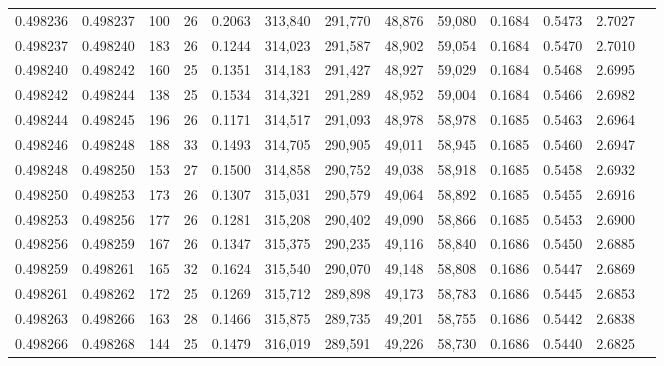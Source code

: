 \begin{tabular}{rrrrrrrrrrrrr}
0.498236 & 0.498237 & 100 &  26 &                                     0.2063 & 313,840 & 291,770 &  48,876 &  59,080 & 0.1684 & 0.5473 & 2.7027 \\
0.498237 & 0.498240 & 183 &  26 &                                     0.1244 & 314,023 & 291,587 &  48,902 &  59,054 & 0.1684 & 0.5470 & 2.7010 \\
0.498240 & 0.498242 & 160 &  25 &                                     0.1351 & 314,183 & 291,427 &  48,927 &  59,029 & 0.1684 & 0.5468 & 2.6995 \\
0.498242 & 0.498244 & 138 &  25 &                                     0.1534 & 314,321 & 291,289 &  48,952 &  59,004 & 0.1684 & 0.5466 & 2.6982 \\
0.498244 & 0.498245 & 196 &  26 &                                     0.1171 & 314,517 & 291,093 &  48,978 &  58,978 & 0.1685 & 0.5463 & 2.6964 \\
0.498246 & 0.498248 & 188 &  33 &                                     0.1493 & 314,705 & 290,905 &  49,011 &  58,945 & 0.1685 & 0.5460 & 2.6947 \\
0.498248 & 0.498250 & 153 &  27 &                                     0.1500 & 314,858 & 290,752 &  49,038 &  58,918 & 0.1685 & 0.5458 & 2.6932 \\
0.498250 & 0.498253 & 173 &  26 &                                     0.1307 & 315,031 & 290,579 &  49,064 &  58,892 & 0.1685 & 0.5455 & 2.6916 \\
0.498253 & 0.498256 & 177 &  26 &                                     0.1281 & 315,208 & 290,402 &  49,090 &  58,866 & 0.1685 & 0.5453 & 2.6900 \\
0.498256 & 0.498259 & 167 &  26 &                                     0.1347 & 315,375 & 290,235 &  49,116 &  58,840 & 0.1686 & 0.5450 & 2.6885 \\
0.498259 & 0.498261 & 165 &  32 &                                     0.1624 & 315,540 & 290,070 &  49,148 &  58,808 & 0.1686 & 0.5447 & 2.6869 \\
0.498261 & 0.498262 & 172 &  25 &                                     0.1269 & 315,712 & 289,898 &  49,173 &  58,783 & 0.1686 & 0.5445 & 2.6853 \\
0.498263 & 0.498266 & 163 &  28 &                                     0.1466 & 315,875 & 289,735 &  49,201 &  58,755 & 0.1686 & 0.5442 & 2.6838 \\
0.498266 & 0.498268 & 144 &  25 &                                     0.1479 & 316,019 & 289,591 &  49,226 &  58,730 & 0.1686 & 0.5440 & 2.6825 \\

\end{tabular}
